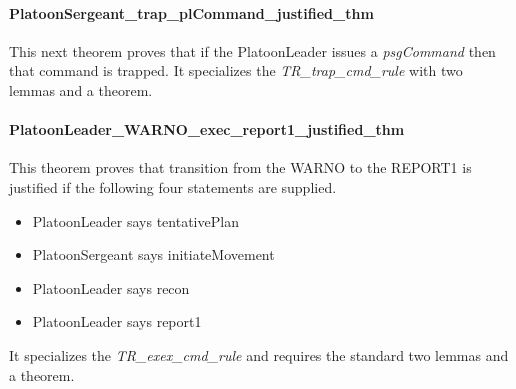 \documentclass[../../main/main.tex]{subfiles}
\begin{document}
\HOLssmPlanPBTheoremsPlatoonLeaderXXpsgCommandXXnotDiscardXXthm


\paragraph*{PlatoonSergeant_trap_plCommand_justified_thm}
This next theorem proves that if the PlatoonLeader issues a \textit{psgCommand} then that command is trapped.  It specializes the \textit{TR_trap_cmd_rule} with two lemmas and a theorem.

\HOLssmPlanPBTheoremsPlatoonLeaderXXtrapXXpsgCommandXXlemma

\HOLssmPlanPBTheoremsPlatoonLeaderXXtrapXXpsgCommandXXjustifiedXXlemma

\HOLssmPlanPBTheoremsPlatoonSergeantXXtrapXXplCommandXXjustifiedXXthm


\paragraph*{PlatoonLeader_WARNO_exec_report1_justified_thm}
This theorem proves that transition from the WARNO to the REPORT1 is justified if the following four statements are supplied.
\begin{itemize}
\item PlatoonLeader says tentativePlan
\item PlatoonSergeant says initiateMovement
\item PlatoonLeader says recon
\item PlatoonLeader says report1
\end{itemize}

It specializes the \textit{TR_exex_cmd_rule} and requires the standard two lemmas and a theorem. 

\HOLssmPlanPBTheoremsPlatoonLeaderXXWARNOXXexecXXreportOneXXlemma

\HOLssmPlanPBTheoremsPlatoonLeaderXXWARNOXXexecXXreportOneXXjustifiedXXlemma

\HOLssmPlanPBTheoremsPlatoonLeaderXXWARNOXXexecXXreportOneXXjustifiedXXthm
\end{document}
